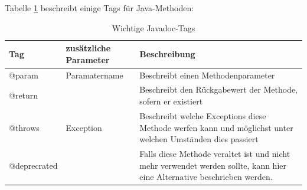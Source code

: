 Tabelle \ref{tab:table_javadoc_method} beschreibt einige Tags für Java-Methoden:
\begin{table}[h]
    \centering
    \begin{tabular}{m{4cm}|m{4cm}|m{7cm}}
    Tag & zusätzliche Parameter &Beschreibung\\
    \hline
        @param  & Paramatername & Beschreibt einen Methodenparameter\\
        \hline
         @return & & Beschreibt den Rückgabewert der Methode, sofern er existiert \\
         \hline
         @throws &Exception & Beschreibt welche Exceptions diese Methode werfen kann und möglichst unter welchen Umständen dies passiert \\
           \hline
         @deprecrated & & Falls diese Methode veraltet ist und nicht mehr verwendet werden sollte, kann hier eine Alternative beschrieben werden. \\
           \hline
         
           \hline
         
         
         
         
    \end{tabular}
    \caption{Wichtige Javadoc-Tags}
    \label{tab:table_javadoc_method}
\end{table}




